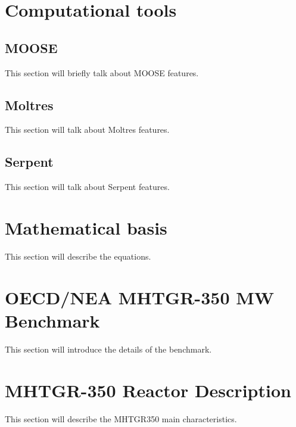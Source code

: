 
\section{Computational tools}

\subsection{MOOSE}

This section will briefly talk about MOOSE features.

\subsection{Moltres}

This section will talk about Moltres features.

\subsection{Serpent}

This section will talk about Serpent features.

\section{Mathematical basis}

This section will describe the equations.

\section{OECD/NEA MHTGR-350 MW Benchmark}

This section will introduce the details of the benchmark.

\section{MHTGR-350 Reactor Description}

This section will describe the MHTGR350 main characteristics.

